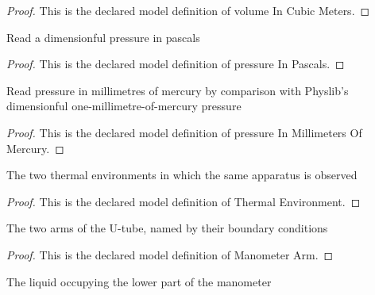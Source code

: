 \begin{proof}
  This is the declared model definition of volume In Cubic Meters.
\end{proof}
\begin{definition}
  \label{def:physics:phyx-mini-0365:phyxminiproblems-problemphyxmini0365-pressureinpascals}
  Read a dimensionful pressure in pascals
\end{definition}
\begin{proof}
  This is the declared model definition of pressure In Pascals.
\end{proof}
\begin{definition}
  \label{def:physics:phyx-mini-0365:phyxminiproblems-problemphyxmini0365-pressureinmillimetersofmercury}
  Read pressure in millimetres of mercury by comparison with Physlib's dimensionful one-millimetre-of-mercury pressure
\end{definition}
\begin{proof}
  This is the declared model definition of pressure In Millimeters Of Mercury.
\end{proof}
\begin{definition}
  \label{def:physics:phyx-mini-0365:phyxminiproblems-problemphyxmini0365-thermalenvironment}
  The two thermal environments in which the same apparatus is observed
\end{definition}
\begin{proof}
  This is the declared model definition of Thermal Environment.
\end{proof}
\begin{definition}
  \label{def:physics:phyx-mini-0365:phyxminiproblems-problemphyxmini0365-manometerarm}
  The two arms of the U-tube, named by their boundary conditions
\end{definition}
\begin{proof}
  This is the declared model definition of Manometer Arm.
\end{proof}
\begin{definition}
  \label{def:physics:phyx-mini-0365:phyxminiproblems-problemphyxmini0365-manometerliquid}
  The liquid occupying the lower part of the manometer
\end{definition}
